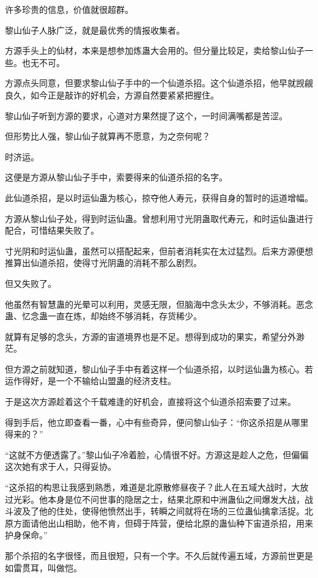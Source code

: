\begin{this_body}
许多珍贵的信息，价值就很超群。

黎山仙子人脉广泛，就是最优秀的情报收集者。

方源手头上的仙材，本来是想参加炼蛊大会用的。但分量比较足，卖给黎山仙子一些。也无不可。

方源点头同意，但要求黎山仙子手中的一个仙道杀招。这个仙道杀招，他早就觊觎良久，如今正是敲诈的好机会，方源自然要紧紧把握住。

黎山仙子听到方源的要求，心道对方果然提了这个，一时间满嘴都是苦涩。

但形势比人强，黎山仙子就算再不愿意，为之奈何呢？

时济运。

这便是方源从黎山仙子手中，索要得来的仙道杀招的名字。

此仙道杀招，是以时运仙蛊为核心，掠夺他人寿元，获得自身的暂时的运道增幅。

方源从黎山仙子处，得到时运仙蛊。曾想利用寸光阴蛊取代寿元，和时运仙蛊进行配合，可惜结果失败了。

寸光阴和时运仙蛊，虽然可以搭配起来，但前者消耗实在太过猛烈。后来方源便想推算出仙道杀招，使得寸光阴蛊的消耗不那么剧烈。

但又失败了。

他虽然有智慧蛊的光晕可以利用，灵感无限，但脑海中念头太少，不够消耗。恶念蛊、忆念蛊一直在炼，却始终不够消耗，存货稀少。

就算有足够的念头，方源的宙道境界也是不足。想得到成功的果实，希望分外渺茫。

但方源之前就知道，黎山仙子手中有着这样一个仙道杀招，以时运仙蛊为核心。若运作得好，是一个不输给山盟蛊的经济支柱。

于是这次方源趁着这个千载难逢的好机会，直接将这个仙道杀招索要了过来。

得到手后，他立即查看一番，心中有些奇异，便问黎山仙子：“你这杀招是从哪里得来的？”

“这就不方便透露了。”黎山仙子冷着脸，心情很不好。方源这是趁人之危，但偏偏这次她有求于人，只得妥协。

“这杀招的构思让我感到熟悉，难道是北原散修昼夜子？此人在五域大战时，大放过光彩。他本身是位不问世事的隐居之士，结果北原和中洲蛊仙之间爆发大战，战斗波及了他的住处，使得他愤然出手，转瞬之间就将在场的三位蛊仙擒拿活捉。北原方面请他出山相助，他不肯，但碍于阵营，便给北原的蛊仙种下宙道杀招，用来护身保命。”

那个杀招的名字很怪，而且很短，只有一个字。不久后就传遍五域，方源前世更是如雷贯耳，叫做恺。


\end{this_body}
